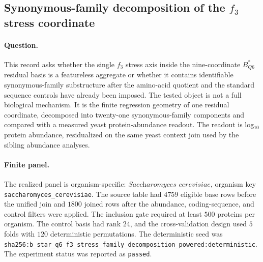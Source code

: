 
\subsection{Synonymous-family decomposition of the $f_3$ stress coordinate}
\label{sec:bioreality-f3-stress-family-decomposition}

\paragraph{Question.}
This record asks whether the single $f_3$ stress axis inside the nine-coordinate $B^*_{Q6}$ residual basis is a featureless aggregate or whether it contains identifiable synonymous-family substructure after the amino-acid quotient and the standard sequence controls have already been imposed.  The tested object is not a full biological mechanism.  It is the finite regression geometry of one residual coordinate, decomposed into twenty-one synonymous-family components and compared with a measured yeast protein-abundance readout.  The readout is log$_{10}$ protein abundance, residualized on the same yeast context join used by the sibling abundance analyses.

\paragraph{Finite panel.}
The realized panel is organism-specific: $\textit{Saccharomyces cerevisiae}$, organism key \texttt{saccharomyces\_cerevisiae}.  The source table had $4759$ eligible base rows before the unified join and $1800$ joined rows after the abundance, coding-sequence, and control filters were applied.  The inclusion gate required at least $500$ proteins per organism.  The control basis had rank $24$, and the cross-validation design used $5$ folds with $120$ deterministic permutations.  The deterministic seed was \texttt{sha256:b\_star\_q6\_f3\_stress\_family\_decomposition\_powered:deterministic}.  The experiment status was reported as \texttt{passed}.

